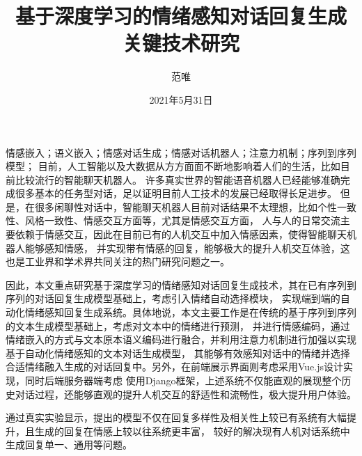 \documentclass[supercite]{HustGraduPaper}
\title{基于深度学习的情绪感知对话回复生成\\关键技术研究}
\author{范唯}
\date{2021年5月31日}
\theoremstyle{definition}
\begin{document}
\maketitle

\statement

\clearpage  
\phantom{s}

\begin{cnabstract}{情感嵌入；语义嵌入；情感对话生成；情感对话机器人；注意力机制；序列到序列模型；}
目前，人工智能以及大数据从方方面面不断地影响着人们的生活，比如目前比较流行的智能聊天机器人。
许多真实世界的智能语音机器人已经能够准确完成很多基本的任务型对话，足以证明目前人工技术的发展已经取得长足进步。
但是，在很多闲聊性对话中，智能聊天机器人目前对话结果不太理想，比如个性一致性、风格一致性、情感交互方面等，尤其是情感交互方面，
人与人的日常交流主要依赖于情感交互，因此在目前已有的人机交互中加入情感因素，使得智能聊天机器人能够感知情感，
并实现带有情感的回复，能够极大的提升人机交互体验，这也是工业界和学术界共同关注的热门研究问题之一。

因此，本文重点研究基于深度学习的情绪感知对话回复生成技术，其在已有序列到序列的对话回复生成模型基础上，考虑引入情绪自动选择模块，
实现端到端的自动化情绪感知回复生成系统。具体地说，本文主要工作是在传统的基于序列到序列的文本生成模型基础上，考虑对文本中的情绪进行预测，
并进行情感编码，通过情绪嵌入的方式与文本原本语义编码进行融合，并利用注意力机制进行加强以实现基于自动化情绪感知的文本对话生成模型，
其能够有效感知对话中的情绪并选择合适情绪融入生成的对话回复中。另外，在前端展示界面则考虑采用Vue.js设计实现，同时后端服务器端考虑
使用Django框架，上述系统不仅能直观的展现整个历史对话过程，还能够直观的提升人机交互的舒适性和流畅性，极大提升用户体验。

通过真实实验显示，提出的模型不仅在回复多样性及相关性上较已有系统有大幅提升，且生成的回复在情感上较以往系统更丰富，
较好的解决现有人机对话系统中生成回复单一、通用等问题。
\end{cnabstract}
\end{document}
